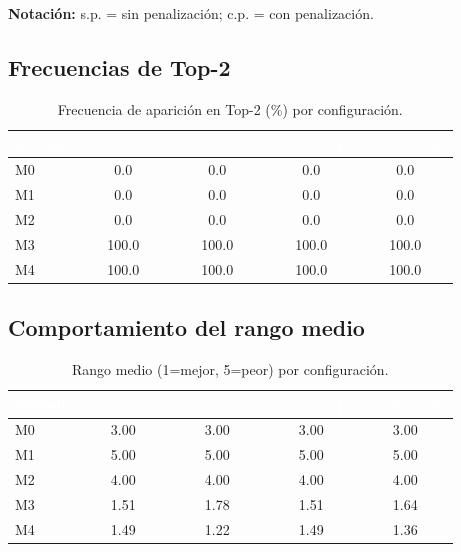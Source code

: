 \documentclass[12pt,a4paper,oneside]{book}
\begin{document}
\textbf{Notación:} s.p. = sin penalización; c.p. = con penalización.

\subsection{Frecuencias de Top-2}

\begin{table}[H]
\centering
\caption{Frecuencia de aparición en Top-2 (\%) por configuración.}
\renewcommand{\arraystretch}{1.3}
\begin{tabular}{lcccc}
\toprule
\rowcolor{primary}
\textcolor{white}{\textbf{Método}} &
\textcolor{white}{\textbf{$\epsilon=10\%$ s.p.}} &
\textcolor{white}{\textbf{$\epsilon=10\%$ c.p.}} &
\textcolor{white}{\textbf{$\epsilon=20\%$ s.p.}} &
\textcolor{white}{\textbf{$\epsilon=20\%$ c.p.}} \\
\midrule
M0 & 0.0 & 0.0 & 0.0 & 0.0 \\
M1 & 0.0 & 0.0 & 0.0 & 0.0 \\
M2 & 0.0 & 0.0 & 0.0 & 0.0 \\
M3 & 100.0 & 100.0 & 100.0 & 100.0 \\
M4 & 100.0 & 100.0 & 100.0 & 100.0 \\
\bottomrule
\end{tabular}
\end{table}

\subsection{Comportamiento del rango medio}

\begin{table}[H]
\centering
\caption{Rango medio (1=mejor, 5=peor) por configuración.}
\renewcommand{\arraystretch}{1.3}
\begin{tabular}{lcccc}
\toprule
\rowcolor{primary}
\textcolor{white}{\textbf{Método}} &
\textcolor{white}{\textbf{$\epsilon=10\%$ s.p.}} &
\textcolor{white}{\textbf{$\epsilon=10\%$ c.p.}} &
\textcolor{white}{\textbf{$\epsilon=20\%$ s.p.}} &
\textcolor{white}{\textbf{$\epsilon=20\%$ c.p.}} \\
\midrule
M0 & 3.00 & 3.00 & 3.00 & 3.00 \\
M1 & 5.00 & 5.00 & 5.00 & 5.00 \\
M2 & 4.00 & 4.00 & 4.00 & 4.00 \\
M3 & 1.51 & 1.78 & 1.51 & 1.64 \\
M4 & 1.49 & 1.22 & 1.49 & 1.36 \\
\bottomrule
\end{tabular}
\end{table}
\end{document}
